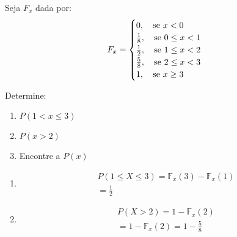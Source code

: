 \begin{description}
   \item  [Exemplo:]
   \item  Seja $F_{x}$ dada por:
     \begin{align*}
       F_{x}=\begin{cases} 
         0, \text{\quad se }x<0 \\
         \frac{1}{8},\text{\quad se }0 \le x <1 \\
         \frac{1}{2}, \text{\quad se }1 \le x < 2 \\
         \frac{5}{8}, \text{\quad se }2 \le x < 3 \\
         1,\text{\quad se } x \geq 3
       \end{cases}
     \end{align*}

     Determine: 
     \begin{enumerate}[label=(\alph*)]
       \item $P(1 < x \le 3)$
       \item $P(x>2)$
       \item Encontre a $P(x)$
     \end{enumerate}
     \begin{enumerate}[label= (\alph*)]
       \item 
         \begin{align*}
           P(1 \le X \le 3)= \mathbb{F}_{x}(3) - \mathbb{F}_{x}(1) \\
           = \frac{1}{2}
         \end{align*}
       \item 
         \begin{align*}
           P( X > 2)=1 - \mathbb{F}_{x}(2) \\
           = 1- \mathbb{F}_{x}(2)= 1 - \frac{5}{8}
         \end{align*}


\end{enumerate}
\end{description}
